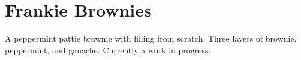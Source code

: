 \section{Frankie Brownies}


\begin{recipestats}[
	servings=36,
	preptime=15 \minute~+chill,
	bakingtime=33 \minute~,
	original=\citefield{mikesPeppermint2020}{shorttitle} \cite{mikesPeppermint2020},
]
\end{recipestats}


\begin{recipeabstract}
	A peppermint pattie brownie with filling from scratch.
	Three layers of brownie, peppermint, and ganache.
	Currently a work in progress.
\end{recipeabstract}


\begin{ingredientcolumns}
	\begin{ingredientblock}[brownie]
		\\
		\\
		\\
		\\
		\\
		\\
		\\
	\end{ingredientblock}
	\begin{ingredientblock}[peppermint]
		\\
		\\
		\\
		\\
	\end{ingredientblock}
	\begin{ingredientblock}[ganache]
		\\
	\end{ingredientblock}
\end{ingredientcolumns}



